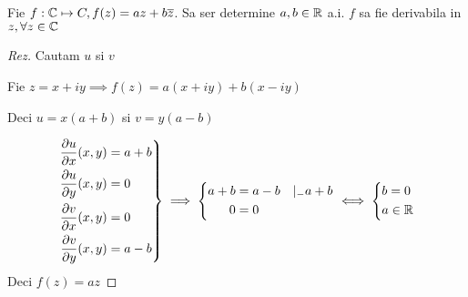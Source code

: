 \begin{example}
	Fie $f:\mathbb{C} \mapsto C, f(z) = az + b\overline{z}$. Sa ser determine $a,b \in \mathbb{R}$ a.i.
	$f$ sa fie derivabila in $z, \forall z \in \mathbb{C}$
	\begin{proof}[Rez]
		Cautam $u$ si $v$ 
		
		Fie $z=x+iy \implies f(z) = a(x+iy) + b(x-iy)$ 
		
		Deci $u=x(a+b)$ si  $v=y(a-b)$		

		\begin{displaymath}
			\left.
				\begin{aligned}
					\frac{\partial u}{\partial x} (x,y) &=  a+b \\
					\frac{\partial u}{\partial y} (x,y) &= 0    \\
					\frac{\partial v}{\partial x} (x,y) &= 0    \\
					\frac{\partial v}{\partial y} (x,y) &= a-b \\
				\end{aligned}
			\right \}
			\implies
			\left \{
				\begin{aligned}
					a+b &= a-b \quad |_ -a + b   \\
					0 &=0
				\end{aligned}
			\right.
			\iff
			\left \{
				\begin{aligned}
					&b = 0   \\
					&a \in \mathbb{R}					
				\end{aligned}
			\right.						
		\end{displaymath}
		Deci $f(z) = az$
	\end{proof}
\end{example}
